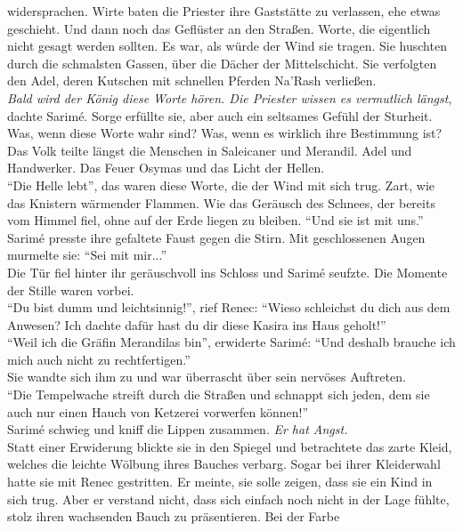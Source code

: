 widersprachen. Wirte baten die Priester ihre Gaststätte zu verlassen, ehe etwas geschieht. Und dann 
noch das Geflüster an den Straßen. Worte, die eigentlich nicht gesagt werden sollten. Es war, als 
würde der Wind sie tragen. Sie huschten durch die schmalsten Gassen, über die Dächer der 
Mittelschicht. Sie verfolgten den Adel, deren Kutschen mit schnellen Pferden Na'Rash verließen.\\
\textit{Bald wird der König diese Worte hören. Die Priester wissen es vermutlich längst}, dachte 
Sarimé. Sorge erfüllte sie, aber auch ein seltsames Gefühl der Sturheit. Was, wenn diese Worte wahr 
sind? Was, wenn es wirklich ihre Bestimmung ist?\\
Das Volk teilte längst die Menschen in Saleicaner und Merandil. Adel und Handwerker. Das Feuer 
Osymas und das Licht der Hellen.\\
``Die Helle lebt'', das waren diese Worte, die der Wind mit sich trug. Zart, wie das Knistern 
wärmender Flammen. Wie das Geräusch des Schnees, der bereits vom Himmel fiel, ohne auf der 
Erde liegen zu bleiben. ``Und sie ist mit uns.''\\
Sarimé presste ihre gefaltete Faust gegen die Stirn. Mit geschlossenen Augen murmelte sie: ``Sei 
mit mir...''\\
Die Tür fiel hinter ihr geräuschvoll ins Schloss und Sarimé seufzte. Die Momente der Stille waren 
vorbei.\\
``Du bist dumm und leichtsinnig!'', rief Renec: ``Wieso schleichst du dich aus dem Anwesen? Ich 
dachte dafür hast du dir diese Kasira ins Haus geholt!''\\
``Weil ich die Gräfin Merandilas bin'', erwiderte Sarimé: ``Und deshalb brauche ich mich auch nicht 
zu rechtfertigen.''\\
Sie wandte sich ihm zu und war überrascht über sein nervöses Auftreten.\\
``Die Tempelwache streift durch die Straßen und schnappt sich jeden, dem sie auch nur einen Hauch 
von Ketzerei vorwerfen können!''\\
Sarimé schwieg und kniff die Lippen zusammen. \textit{Er hat Angst.}\\
Statt einer Erwiderung blickte sie in den Spiegel und betrachtete das zarte Kleid, welches die 
leichte Wölbung ihres Bauches verbarg. Sogar bei ihrer Kleiderwahl hatte sie mit Renec gestritten. 
Er meinte, sie solle zeigen, dass sie ein Kind in sich trug. Aber er verstand nicht, dass sich 
einfach noch nicht in der Lage fühlte, stolz ihren wachsenden Bauch zu präsentieren. Bei der Farbe 
